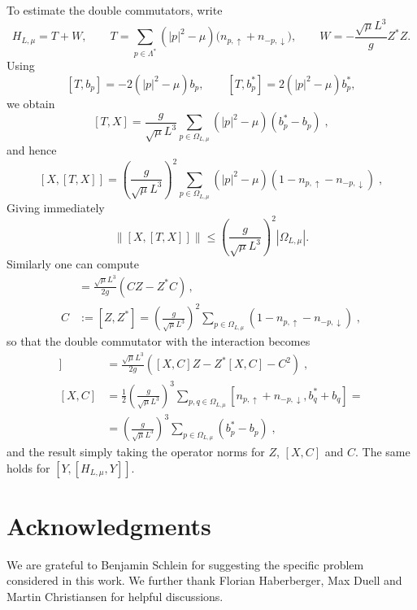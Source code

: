 \documentclass[11pt]{amsart}
\theoremstyle{definition}
\numberwithin{equation}{section}
\newcommand{\1}{\mathbf 1}
\begin{document}
To estimate the double commutators, write
\[
 H_{L,\mu}=T+W, \qquad T=\sum_{p\in\Lambda^*}\left(|p|^2 - \mu \right)
 \bigl(n_{p,\uparrow}+n_{-p,\downarrow}\bigr),
 \qquad
 W=-\frac{\sqrt{\mu}L^3}{g}Z^* Z.
\]
Using
\[
 [T,b_p]=-2\left(|p|^2 - \mu \right) b_p,\qquad
 [T,b_p^*]=2\left(|p|^2 - \mu \right) b_p^*,
\]
we obtain
\[
 [T,X] = \frac{g}{\sqrt{\mu}L^3}\sum_{p \in \Omega_{L, \mu}}\left( |p|^2 - \mu \right)(b^*_p - b_p)\;,
\]
and hence
\[
 [X,[T,X]] = \left(\frac{g}{\sqrt{\mu}L^3} \right)^2 \sum_{p \in \Omega_{L, \mu}}\left( |p|^2 - \mu \right) (1 - n_{p, \uparrow} - n_{-p, \downarrow})\;,
\]
Giving immediately
\begin{equation*}
  \|[X,[T,X]]\|\le \left(\frac{g}{\sqrt{\mu}L^3} \right)^2|\Omega_{L, \mu}|.  
\end{equation*}
Similarly one can compute
\begin{align*}
    [W, X] &= \frac{\sqrt{\mu}L^3}{2g}\left(CZ - Z^*C  \right)\,,\\
    C&:= [Z, Z^*] = \left(\frac{g}{\sqrt{\mu}L^3} \right)^2 \sum_{p \in \Omega_{L,\mu}}(1 - n_{p, \uparrow} - n_{-p, \downarrow})\;,
\end{align*}
so that the double commutator with the interaction becomes
\begin{align*}
    [X, [W, X]] &= \frac{\sqrt{\mu}L^3}{2g} \left([X, C]Z - Z^*[X, C] - C^2 \right)\;, \\
    [X,C] &= \frac{1}{2}\left( \frac{g}{\sqrt{\mu}L^3} \right)^3 \sum_{p, q \in \Omega_{L,\mu}}[n_{p, \uparrow} + n_{-p, \downarrow}, b^*_q + b_q] = \\
    &=\left( \frac{g}{\sqrt{\mu}L^3} \right)^3 \sum_{p \in \Omega_{L,\mu}}(b^*_p - b_p)\;,
\end{align*}
and the result simply taking the operator norms for $Z$, $[X,C]$ and $C$. The same holds for $[Y, [H_{L, \mu}, Y]]$.



\section*{Acknowledgments}

We are grateful to Benjamin Schlein for suggesting the specific problem
considered in this work. We further thank Florian Haberberger, Max Duell and Martin Christiansen 
for helpful discussions.



\end{document}
